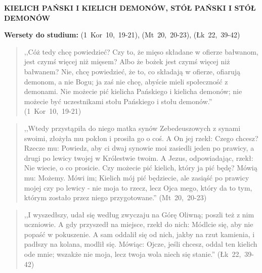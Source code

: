 \documentclass[10pt,a4paper,oneside]{article}
\begin{document}
\centerline{\textbf{\MakeUppercase{Kielich Pański i kielich demonów, stół Pański i stół demonów}}}
\begin{center}
\textbf{Wersety do studium:} (1~Kor~10,~19-21), (Mt~20,~20-23), (Łk~22,~39-42)
\end{center}
\begin{quote}
,,Cóż tedy chcę powiedzieć? Czy to, że mięso składane w ofierze bałwanom, jest czymś więcej niż mięsem? Albo że bożek jest czymś więcej niż bałwanem? Nie, chcę powiedzieć, że to, co składają w ofierze, ofiarują demonom, a nie Bogu; ja zaś nie chcę, abyście mieli społeczność z demonami. Nie możecie pić kielicha Pańskiego i kielicha demonów; nie możecie być uczestnikami stołu Pańskiego i stołu demonów.'' (1~Kor~10,~19-21)
\end{quote}
\begin{quote}
,,Wtedy przystąpiła do niego matka synów Zebedeuszowych z synami swoimi, złożyła mu pokłon i prosiła go o coś. A On jej rzekł: Czego chcesz? Rzecze mu: Powiedz, aby ci dwaj synowie moi zasiedli jeden po prawicy, a drugi po lewicy twojej w Królestwie twoim. A Jezus, odpowiadając, rzekł: Nie wiecie, o co prosicie. Czy możecie pić kielich, który ja pić będę? Mówią mu: Możemy. Mówi im; Kielich mój pić będziecie, ale zasiąść po prawicy mojej czy po lewicy - nie moja to rzecz, lecz Ojca mego, który da to tym, którym zostało przez niego przygotowane.'' (Mt~20,~20-23)
\end{quote}
\begin{quote}
,,I wyszedłszy, udał się według zwyczaju na Górę Oliwną; poszli też z nim uczniowie. A gdy przyszedł na miejsce, rzekł do nich: Módlcie się, aby nie popaść w pokuszenie. A sam oddalił się od nich, jakby na rzut kamienia, i padłszy na kolana, modlił się. Mówiąc: Ojcze, jeśli chcesz, oddal ten kielich ode mnie; wszakże nie moja, lecz twoja wola niech się stanie.'' (Łk~22,~39-42)
\end{quote}
\end{document}
